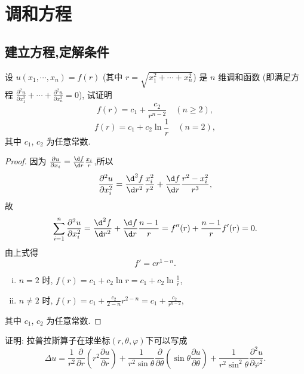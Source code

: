 \chapter{调和方程}

\section{建立方程,定解条件}

\begin{exercise}
  设 $u(x_1,\cdots,x_n)=f(r)$ (其中 $r=\sqrt{x_1^2+\cdots+x_n^2}$)
  是 $n$ 维调和函数 (即满足方程
  $\frac{\partial^2u}{\partial x_1^2}+\cdots+\frac{\partial^2u}{\partial x_n^2}=0$),
  试证明
  \[f(r) = c_1+\frac{c_2}{r^{n-2}}\quad (n\geq 2),\]
  \[f(r) = c_1+c_2\ln\frac{1}{r}\quad (n=2),\]
  其中 $c_1$, $c_2$ 为任意常数.
\end{exercise}

\begin{proof}
  因为 $\frac{\partial u}{\partial x_i}=\frac{\d f}{\d r}\frac{x_i}{r}$,所以
  \[\frac{\partial^2u}{\partial x_i^2} =
    \frac{\d^2f}{\d r^2}\frac{x_i^2}{r^2}
    + \frac{\d f}{\d r}\frac{r^2-x_i^2}{r^3},\]
  故
  \[\sum_{i=1}^n\frac{\partial^2u}{\partial x_i^2}
    = \frac{\d^2f}{\d r^2}+\frac{\d f}{\d r}\frac{n-1}{r}
    = f''(r)+\frac{n-1}{r}f'(r)=0.\]
  由上式得
  \[f'=cr^{1-n}.\]
  \begin{enumerate}[(i)]
    \item $n = 2$ 时, $f(r)=c_1+c_2\ln r=c_1+c_2\ln\frac{1}{r}$,
    \item $n\neq 2$ 时, $f(r)=c_1+\frac{c_2}{2-n}r^{2-n}=c_1+\frac{c_2}{r^{n-2}}$,
  \end{enumerate}
  其中 $c_1$, $c_2$ 为任意常数.
\end{proof}


\begin{exercise}
  证明: 拉普拉斯算子在球坐标$(r,\theta,\varphi)$下可以写成
  \[\Delta u
    = \frac{1}{r^2}\frac{\partial}{\partial r}\left(r^2\frac{\partial u}{\partial r}\right)
    + \frac{1}{r^2\sin\theta}\frac{\partial}{\partial\theta}
      \left(\sin\theta\frac{\partial u}{\partial\theta}\right)
    +\frac{1}{r^2\sin^2\theta}\frac{\partial^2u}{\partial\varphi^2}.\]
\end{exercise}

